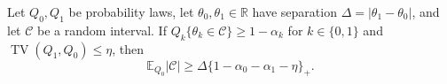 Let \(Q_0,Q_1\) be probability laws, let \(\theta_0,\theta_1\in\mathbb R\) have separation \(\Delta=|\theta_1-\theta_0|\), and let \(\mathcal C\) be a random interval. If \(Q_k\{\theta_k\in\mathcal C\}\ge1-\alpha_k\) for \(k\in\{0,1\}\) and \(\operatorname{TV}(Q_1,Q_0)\le\eta\), then
\[
\mathbb E_{Q_0}|\mathcal C|\ge\Delta\{1-\alpha_0-\alpha_1-\eta\}_+.
\]